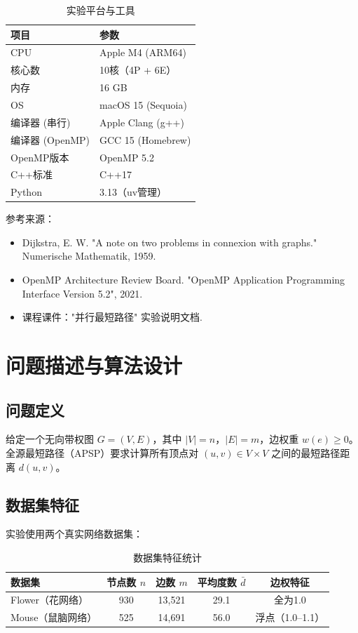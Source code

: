 \documentclass[UTF8,a4paper,12pt,fontset=none]{ctexart}
\begin{document}
\begin{table}[H]
  \centering
  \caption{实验平台与工具}
  \label{tab:platform}
  \begin{tabular}{ll}
    \toprule
    项目 & 参数 \\
    \midrule
    CPU & Apple M4 (ARM64) \\
    核心数 & 10核（4P + 6E） \\
    内存 & 16 GB \\
    OS & macOS 15 (Sequoia) \\
    编译器 (串行) & Apple Clang (g++) \\
    编译器 (OpenMP) & GCC 15 (Homebrew) \\
    OpenMP版本 & OpenMP 5.2 \\
    C++标准 & C++17 \\
    Python & 3.13（uv管理） \\
    \bottomrule
  \end{tabular}
\end{table}

参考来源：
\begin{itemize}
  \item Dijkstra, E. W. "A note on two problems in connexion with graphs." Numerische Mathematik, 1959.
  \item OpenMP Architecture Review Board. "OpenMP Application Programming Interface Version 5.2", 2021.
  \item 课程课件："并行最短路径" 实验说明文档.
\end{itemize}

\section{问题描述与算法设计}

\subsection{问题定义}

给定一个无向带权图 $G = (V, E)$，其中 $|V| = n$，$|E| = m$，边权重 $w(e) \ge 0$。
全源最短路径（APSP）要求计算所有顶点对 $(u, v) \in V \times V$ 之间的最短路径距离
$d(u, v)$。

\subsection{数据集特征}

实验使用两个真实网络数据集：

\begin{table}[H]
  \centering
  \caption{数据集特征统计}
  \label{tab:datasets}
  \begin{tabular}{lcccc}
    \toprule
    数据集 & 节点数 $n$ & 边数 $m$ & 平均度数 $\bar{d}$ & 边权特征 \\
    \midrule
    Flower（花网络） & 930 & 13,521 & 29.1 & 全为1.0 \\
    Mouse（鼠脑网络） & 525 & 14,691 & 56.0 & 浮点（1.0--1.1） \\
    \bottomrule
  \end{tabular}
\end{table}
\end{document}

